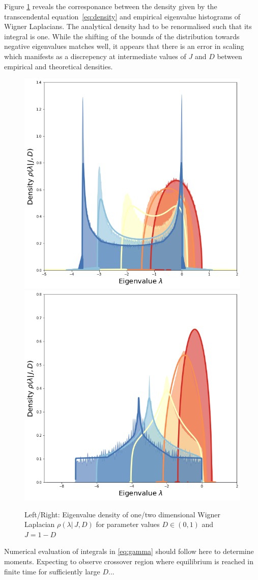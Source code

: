 \documentclass{article}[12pt]
\numberwithin{equation}{section}
\begin{document}
Figure \ref{fig:spectra} reveals the corresponance between the density given by
the transcendental equation~\eqref{eq:density} and empirical eigenvalue histograms of
Wigner Laplacians. The analytical density had to be renormalised such that its integral
is one. While the shifting of the bounds of the distribution towards negative
eigenvalues matches well, it appears that there is an error in scaling which manifests
as a discrepency at intermediate values of $J$ and $D$ between empirical and theoretical
densities.
\begin{figure}[H]
\centering{}
\captionsetup{justification=centering}
\includegraphics[scale=0.3]{figures/interaction1d}
\includegraphics[scale=0.3]{figures/interaction2d}
\caption{Left/Right: Eigenvalue density of one/two dimensional Wigner \\Laplacian
$\rho(\lambda|\,J,D)$ for parameter values $D\in(0,1)$ and $J=1-D$}
\label{fig:spectra}
\end{figure}
Numerical evaluation of integrals in \eqref{eq:gamma} should follow here to
determine moments. Expecting to observe crossover region where equilibrium
is reached in finite time for sufficiently large $D$...



\end{document}
